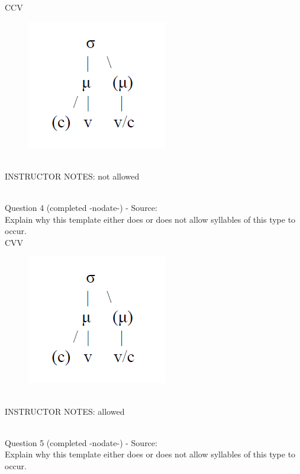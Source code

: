 \documentclass[12pt]{article}
\begin{document}
CCV

\begin{figure}[H]
\includegraphics{../images/ponapean_syllabletemplate.png}
\end{figure}

~\\
INSTRUCTOR NOTES: not allowed


~\\

{\large Question 4} (completed -nodate-) - Source: \\

Explain why this template either does or does not allow syllables of this type to occur.\\

CVV

\begin{figure}[H]
\includegraphics{../images/ponapean_syllabletemplate.png}
\end{figure}

~\\
INSTRUCTOR NOTES: allowed


~\\

{\large Question 5} (completed -nodate-) - Source: \\

Explain why this template either does or does not allow syllables of this type to occur.\\
\end{document}
